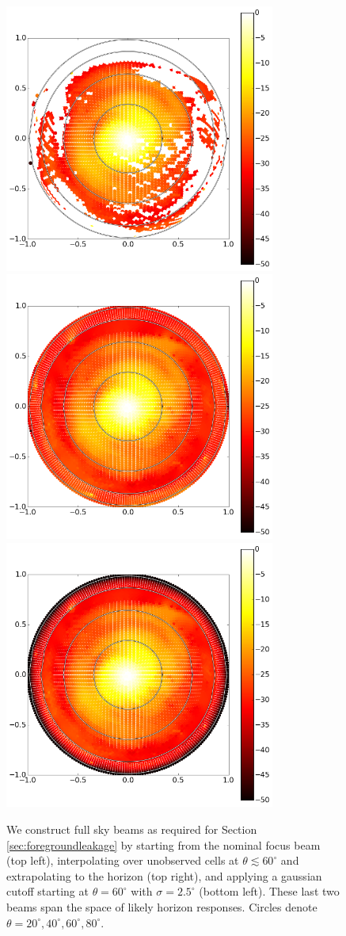 \documentclass{emulateapj}
\begin{document}
\begin{figure}[h]
\includegraphics[width=3.5in]{measbeam_raw.png}
\includegraphics[width=3.5in]{measbeam_interp.png}
\includegraphics[width=3.5in]{measbeam_interp_expcutoff.png}
\caption{We construct full sky beams as required for Section \ref{sec:foregroundleakage} by starting from the nominal focus beam (top left), interpolating over unobserved cells at $\theta\lesssim60^\circ$ and extrapolating to the horizon (top right), and applying a gaussian cutoff starting at $\theta=60^\circ$ with $\sigma=2.5^\circ$ (bottom left). These last two beams span the space of likely horizon responses. Circles denote $\theta=20^\circ,40^\circ,60^\circ,80^\circ$.}
\label{fig:interpbeams}
\end{figure}
\end{document}
